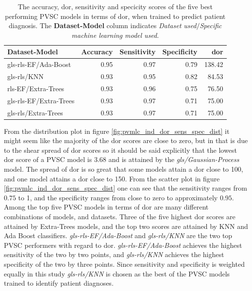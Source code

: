 \begin{table}
    \centering
    \begin{tabular}{lrrrr}
        \toprule
        Dataset-Model          &  Accuracy &  Sensitivity &  Specificity &  \acrshort{dor} \\
        \midrule
        gls-rls-EF/Ada-Boost   &      0.95 &         0.97 &         0.79 & 138.42 \\
        gls-rls/KNN            &      0.93 &         0.95 &         0.82 &  84.53 \\
        rls-EF/Extra-Trees     &      0.93 &         0.96 &         0.75 &  76.50 \\
        gls-rls-EF/Extra-Trees &      0.93 &         0.97 &         0.71 &  75.00 \\
        gls-rls/Extra-Trees    &      0.93 &         0.97 &         0.71 &  75.00 \\
        \bottomrule
    \end{tabular}
    \caption{The accuracy, \acrshort{dor}, sensitivity and specicity scores of the five best performing PVSC models in terms of \acrshort{dor}, when trained to predict patient diagnosis.
             The \textbf{Dataset-Model} column indicates \textit{Dataset used}$/$\textit{Specific machine learning model used}.}
    \label{tab:pvsc_hf_dor_sens_spec_dist}
\end{table}

From the distribution plot in figure \ref{fig:pvmlc_ind_dor_sens_spec_dist} it might seem like the majority of the \acrshort{dor} scores are close to zero, but in that is due to the shear spread of \acrshort{dor} scores so it should be said explicitly that the lowest \acrshort{dor} score of a PVSC model is 3.68 and is attained by the \textit{gls/Gaussian-Process} model.
The spread of \acrshort{dor} is so great that some models attain a \acrshort{dor} close to 100, and one model attains a \acrshort{dor} close to 150.
From the scatter plot in figure \ref{fig:pvmlc_ind_dor_sens_spec_dist} one can see that the sensitivity ranges from $0.75$ to 1, and the specificity ranges from 
close to zero to approximately $0.95$. 
Among the top five PVSC models in terms of \acrshort{dor} are many different combinations of models, and datasets. 
Three of the five highest \acrshort{dor} scores are attained by Extra-Trees models, and the top two scores are attained by KNN and Ada Boost classifiers. 
\textit{gls-rls-EF/Ada-Boost} and \textit{gls-rls/KNN} are the two top PVSC performers with regard to \acrshort{dor}.
\textit{gls-rls-EF/Ada-Boost} achieves the highest sensitivity of the two by two points, and \textit{gls-rls/KNN} achieves the highest specificity of the two by three points.
Since sensitivity and specificity is weighted equally in this study \textit{gls-rls/KNN} is chosen as the best of the PVSC models trained to identify patient diagnoses.

